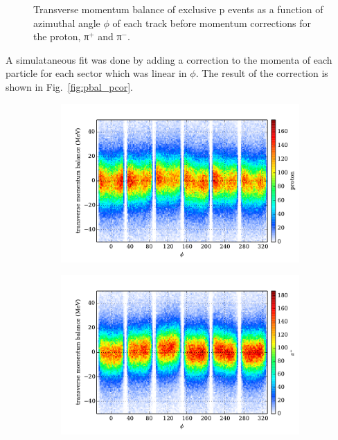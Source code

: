 \begin{figure}
\begin{center}
\begin{subfigure}{0.4\columnwidth}
\end{subfigure}
\caption[Momentum Balance Before Corrections]{\label{fig:pbal.before}Transverse momentum balance of exclusive p \π[+] \π[-] events as a function of azimuthal angle $\phi$ of each track before momentum corrections for the proton, π$^+$ and π$^-$.}
\end{center}\end{figure}

A simulataneous fit was done by adding a correction to the momenta of each particle for each sector which was linear in $\phi$. The result of the correction is shown in Fig.~\ref{fig:pbal_pcor}.

\begin{figure}\begin{center}
\begin{subfigure}{0.4\columnwidth}
    \includegraphics[width=\columnwidth]{figures/pcor/pcor_mptbal_fixed_p.pdf}
\end{subfigure}
\begin{subfigure}{0.4\columnwidth}
    \includegraphics[width=\columnwidth]{figures/pcor/pcor_mptbal_fixed_pip.pdf}

\end{subfigure}
\end{center}
\end{figure}
